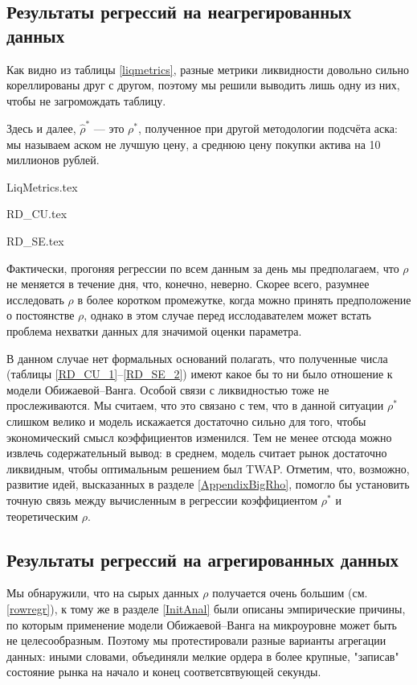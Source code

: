 \subsection{Результаты регрессий на неагрегированных данных}
Как видно из таблицы \ref{liqmetrics}, разные метрики ликвидности довольно сильно кореллированы друг с другом, поэтому 
мы решили выводить лишь одну из них, чтобы не загромождать таблицу.
\par
Здесь и далее, $\hat\rho^*$ --- это $\rho^*$, полученное при другой методологии подсчёта аска: мы называем
аском не лучшую цену, а среднюю цену покупки актива на 10 миллионов рублей.
\par
{LiqMetrics.tex}

{RD_CU.tex}

{RD_SE.tex}

Фактически, прогоняя регрессии по всем данным за день мы предполагаем, что $\rho$ не меняется в течение дня,
что, конечно, неверно. Скорее всего, разумнее исследовать $\rho$ в более коротком промежутке, когда можно принять
предположение о постоянстве $\rho$, однако в этом случае перед исслодавателем может встать проблема нехватки данных
для значимой оценки параметра.
\par
В данном случае нет формальных оснований полагать, что полученные числа 
(таблицы \ref{RD_CU_1}--\ref{RD_SE_2}) имеют какое бы то ни было отношение к модели 
Обижаевой--Ванга. Особой связи с ликвидностью тоже не прослеживаются. Мы считаем, что это связано с тем, 
что в данной ситуации $\rho^*$ слишком велико и модель искажается достаточно сильно для того, 
чтобы экономический смысл коэффициентов изменился. 
Тем не менее отсюда можно извлечь содержательный вывод:
в среднем, модель считает рынок достаточно ликвидным, чтобы оптимальным решением был TWAP. 
Отметим, что, возможно, развитие идей, высказанных в разделе \ref{AppendixBigRho}, 
помогло бы установить точную связь между вычисленным в регрессии
коэффициентом $\rho^*$ и теоретическим $\rho$. 


\subsection{Результаты регрессий на агрегированных данных}
Мы обнаружили, что на сырых данных $\rho$ получается очень большим (см. \ref{rowregr}), к тому же
в разделе \ref{InitAnal} были описаны эмпирические причины, по которым применение 
модели Обижаевой--Ванга на микроуровне может быть не целесообразным. Поэтому мы протестировали разные
варианты агрегации данных: иными словами, объединяли мелкие ордера в более крупные, "записав" 
состояние рынка на начало и конец соответсвтвующей секунды.
\par


